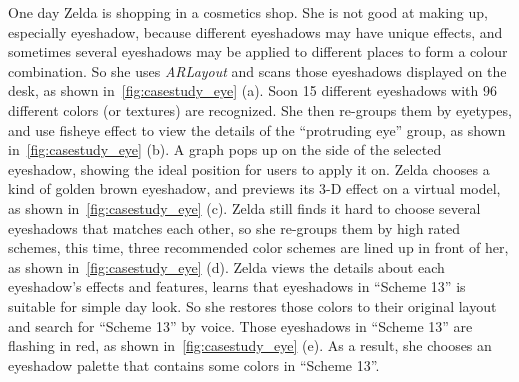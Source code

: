 One day Zelda is shopping in a cosmetics shop.
She is not good at making up, especially eyeshadow,
because different eyeshadows may have unique effects,
and sometimes several eyeshadows may be applied to different places
to form a colour combination.
So she uses \textit{ARLayout} and scans those eyeshadows displayed on the desk, as shown in~\autoref{fig:casestudy_eye} (a).
Soon 15 different eyeshadows with 96 different colors (or textures) are recognized.
She then re-groups them by eyetypes, and use fisheye effect to view the details of the ``protruding eye'' group,
as shown in~\autoref{fig:casestudy_eye} (b).
A graph pops up on the side of the selected eyeshadow, showing the ideal position for users to apply it on.
Zelda chooses a kind of golden brown eyeshadow,
and previews its 3-D effect on a virtual model, as shown in~\autoref{fig:casestudy_eye} (c).
Zelda still finds it hard to choose several eyeshadows that matches each other,
so she re-groups them by high rated schemes, this time,
three recommended color schemes are lined up in front of her, as shown in~\autoref{fig:casestudy_eye} (d).
Zelda views the details about each eyeshadow's effects and features,
learns that eyeshadows in ``Scheme 13'' is suitable for simple day look.
So she restores those colors to their original layout and search for ``Scheme 13'' by voice.
Those eyeshadows in ``Scheme 13'' are flashing in red, as shown in~\autoref{fig:casestudy_eye} (e).
As a result, she chooses an eyeshadow palette that contains
some colors in ``Scheme 13''.


